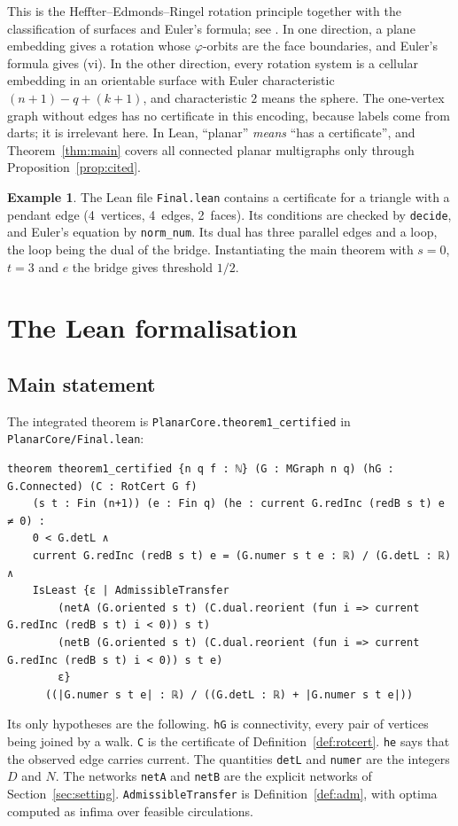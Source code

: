 \documentclass[11pt]{amsart}
\theoremstyle{plain}
\theoremstyle{definition}
\newtheorem{example}{Example}
\theoremstyle{remark}
\newcommand{\code}[1]{\texttt{#1}}
\begin{document}
This is the Heffter--Edmonds--Ringel rotation principle together with the classification of surfaces and Euler's
formula; see \cite{MoharThomassen,GrossTucker}. In one direction, a plane embedding gives a rotation whose
$\varphi$-orbits are the face boundaries, and Euler's formula gives (vi). In the other direction, every rotation
system is a cellular embedding in an orientable surface with Euler characteristic $(n+1)-q+(k+1)$, and
characteristic $2$ means the sphere. The one-vertex graph without edges has no certificate in this encoding, because
labels come from darts; it is irrelevant here. In Lean, ``planar'' \emph{means} ``has a certificate'', and
Theorem~\ref{thm:main} covers all connected planar multigraphs only through Proposition~\ref{prop:cited}.

\begin{example}
The Lean file \code{Final.lean} contains a certificate for a triangle with a pendant edge (4~vertices,
4~edges, 2~faces). Its conditions are checked by \code{decide}, and Euler's equation by \code{norm\_num}. Its dual has three parallel edges and a
loop, the loop being the dual of the bridge. Instantiating the main theorem with $s=0$, $t=3$ and $e$ the bridge
gives threshold $1/2$.
\end{example}

\section{The Lean formalisation}\label{sec:lean}

\subsection{Main statement}
The integrated theorem is \code{PlanarCore.theorem1\_certified} in \code{PlanarCore/Final.lean}:
\begin{lstlisting}
theorem theorem1_certified {n q f : ℕ} (G : MGraph n q) (hG : G.Connected) (C : RotCert G f)
    (s t : Fin (n+1)) (e : Fin q) (he : current G.redInc (redB s t) e ≠ 0) :
    0 < G.detL ∧
    current G.redInc (redB s t) e = (G.numer s t e : ℝ) / (G.detL : ℝ) ∧
    IsLeast {ε | AdmissibleTransfer
        (netA (G.oriented s t) (C.dual.reorient (fun i => current G.redInc (redB s t) i < 0)) s t)
        (netB (G.oriented s t) (C.dual.reorient (fun i => current G.redInc (redB s t) i < 0)) s t e)
        ε}
      ((|G.numer s t e| : ℝ) / ((G.detL : ℝ) + |G.numer s t e|))
\end{lstlisting}
Its only hypotheses are the following. \code{hG} is connectivity, every pair of vertices being joined by a walk.
\code{C} is the certificate of Definition~\ref{def:rotcert}. \code{he} says that the observed edge carries
current. The quantities \code{detL} and \code{numer} are the integers $D$ and $N$. The networks \code{netA} and
\code{netB} are the explicit networks of Section~\ref{sec:setting}. \code{AdmissibleTransfer} is
Definition~\ref{def:adm}, with optima computed as infima over feasible circulations.
\end{document}
